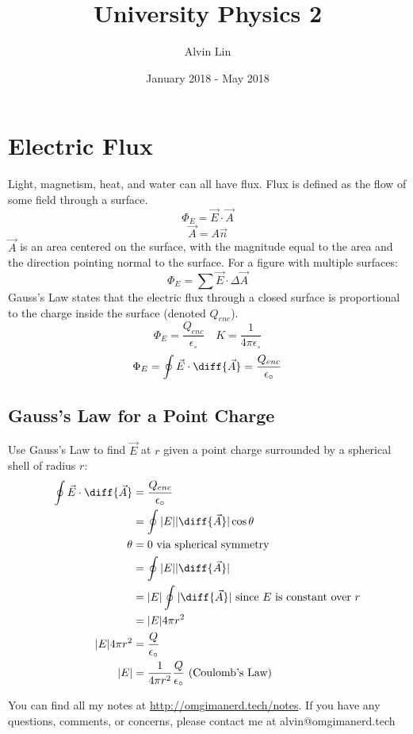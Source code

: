 \documentclass{math}
\title{University Physics 2}
\author{Alvin Lin}
\date{January 2018 - May 2018}
\begin{document}
\maketitle

\section*{Electric Flux}
Light, magnetism, heat, and water can all have flux. Flux is defined as the flow
of some field through a surface.
\[ \Phi_{E} = \vec{E}\cdot\vec{A} \]
\[ \vec{A} = A\vec{n} \]
\( \vec{A} \) is an area centered on the surface, with the magnitude equal to
the area and the direction pointing normal to the surface. For a figure with
multiple surfaces:
\[ \Phi_E = \sum\vec{E}\cdot\Delta\vec{A} \]
Gauss's Law states that the electric flux through a closed surface is
proportional to the charge inside the surface (denoted \( Q_{enc} \)).
\[ \Phi_E = \frac{Q_{enc}}{\epsilon_{\circ}} \quad
  K = \frac{1}{4\pi\epsilon_{\circ}} \]
\[ \Phi_E = \oint\vec{E}\cdot\diff{\vec{A}} =
  \frac{Q_{enc}}{\epsilon_{\circ}} \]

\subsection*{Gauss's Law for a Point Charge}
\begin{center}
\end{center}
Use Gauss's Law to find \( \vec{E} \) at \( r \) given a point charge surrounded
by a spherical shell of radius \( r \):
\begin{align*}
  \oint\vec{E}\cdot\diff{\vec{A}} &= \frac{Q_{enc}}{\epsilon_{\circ}} \\
  &= \oint|E||\diff{\vec{A}}|\cos\theta \\
  \theta &= 0 \text{ via spherical symmetry} \\
  &= \oint|E||\diff{\vec{A}}| \\
  &= |E|\oint|\diff{\vec{A}}| \text{ since } E \text{ is constant over } r \\
  &= |E|4\pi r^2 \\
  |E|4\pi r^2 &= \frac{Q}{\epsilon_{\circ}} \\
  |E| &= \frac{1}{4\pi r^2}\frac{Q}{\epsilon_{\circ}} \text{ (Coulomb's Law)}
\end{align*}

\begin{center}
  You can find all my notes at \url{http://omgimanerd.tech/notes}. If you have
  any questions, comments, or concerns, please contact me at
  alvin@omgimanerd.tech
\end{center}
\end{document}
